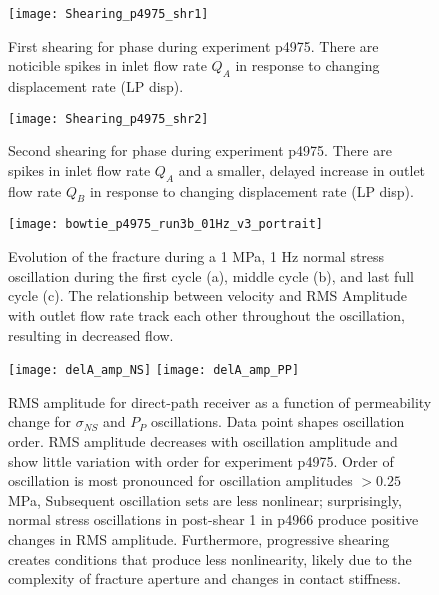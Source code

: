 \documentclass[draft,jgrga]{agutexSI2019}
\begin{document}
\begin{article}
\clearpage

\begin{figure}[ht]
	\centering
	\texttt{[image: Shearing\_p4975\_shr1]}
	\caption{First shearing for phase during experiment p4975. There are noticible spikes in inlet flow rate $ Q_A $ in response to changing displacement rate (LP disp).}
	\label{fig:shr1_p4975}
\end{figure}

\clearpage

\begin{figure}[ht]
	\centering
	\texttt{[image: Shearing\_p4975\_shr2]}
	\caption{Second shearing for phase during experiment p4975. There are spikes in inlet flow rate $ Q_A $ and a smaller, delayed increase in outlet flow rate $ Q_B $ in response to changing displacement rate (LP disp).}
	\label{fig:shr2_p4975}
\end{figure}

\clearpage

\begin{figure*}[ht]
	\centering
	\texttt{[image: bowtie\_p4975\_run3b\_01Hz\_v3\_portrait]}
	\caption[]{Evolution of the fracture during a 1 MPa, 1 Hz normal stress oscillation during the first cycle (a), middle cycle (b), and last full cycle (c). The relationship between velocity and RMS Amplitude with outlet flow rate track each other throughout the oscillation, resulting in decreased flow.} %
	\label{fig:bowties}
\end{figure*}

\clearpage

\begin{figure*}[ht]
	\centering
	\texttt{[image: delA\_amp\_NS]}
	\texttt{[image: delA\_amp\_PP]}
	\caption{RMS amplitude for direct-path receiver as a function of permeability change for $ \sigma_{NS} $ and $ P_P $ oscillations. Data point shapes oscillation order.  RMS amplitude decreases with oscillation amplitude and show little variation with order for experiment p4975. Order of oscillation is most pronounced for oscillation amplitudes $ > 0.25 $ MPa, Subsequent oscillation sets are less nonlinear; surprisingly, normal stress oscillations in post-shear 1 in p4966 produce positive changes in RMS amplitude. Furthermore, progressive shearing creates conditions that produce less nonlinearity, likely due to the complexity of fracture aperture and changes in contact stiffness. }
	\label{fig:delA_ns_amp}
\end{figure*}


\end{article}
\end{document}
